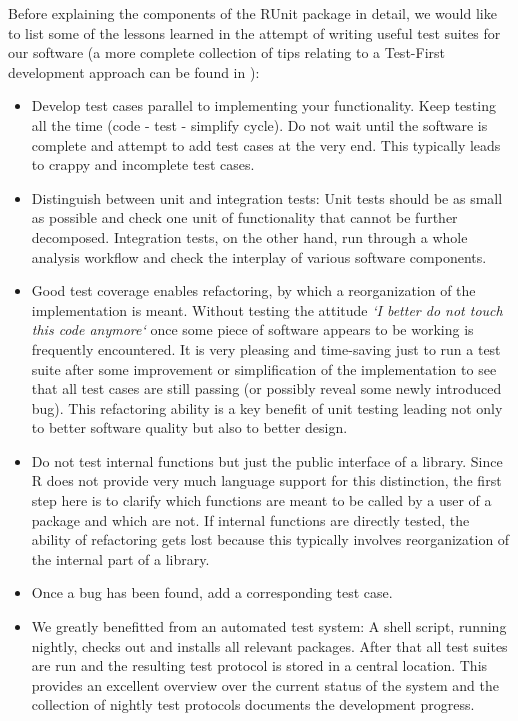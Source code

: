 \documentclass[12pt, a4paper]{article}
\begin{document}
Before explaining the components of the RUnit package in detail,
we would like to list some of the lessons learned in the attempt of
writing useful test suites for our software (a more complete collection
of tips relating to a Test-First development approach can be found in \cite{tfg}):
\begin{itemize}

\item {Develop test cases parallel to implementing your
    functionality. Keep testing all the time (code - test - simplify
    cycle). Do not wait until the software is complete and attempt to
    add test cases at the very end. This typically leads to crappy
    and incomplete test cases.}

\item{Distinguish between unit and integration tests: Unit tests
    should be as small as possible and check one unit of functionality
    that cannot be further decomposed. Integration tests, on the other
    hand, run through a whole analysis workflow and check the
    interplay of various software components.}

\item{Good test coverage enables refactoring, by which a
        reorganization of the implementation is meant. Without testing the
        attitude {\it `I better do not touch this code anymore`} once some piece
        of software appears to be working is frequently
        encountered. It is very pleasing and time-saving just to run a
        test suite after some improvement or simplification of the
        implementation to see that all test cases are still passing
        (or possibly reveal some newly introduced bug). This
        refactoring ability is a key benefit of unit testing leading
        not only to better software quality but also to better design.}

\item{Do not test internal functions but just the public interface of
    a library. Since R does not provide very much language support for this
    distinction, the first step here is to clarify which
    functions are meant to be called by a user of a package and which are
    not. If internal functions are directly tested, the ability of
    refactoring gets lost because this typically involves
    reorganization of the internal part of a library.}

\item {Once a bug has been found, add a corresponding test case.}

\item{We greatly benefitted from an automated test system: A
    shell script, running nightly, checks out and installs all relevant packages.
    After that all test suites are run and the resulting test protocol is stored
    in a central location. This provides an excellent overview over the current
    status of the system and the collection of nightly test protocols documents
    the development progress.}

\end{itemize}
\end{document}
